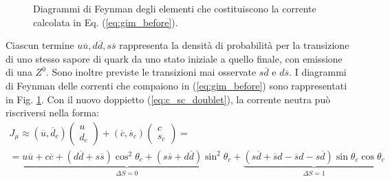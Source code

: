 \documentclass{subnucbo}
\begin{document}
\begin{figure}[!h]
        \centering
        \caption{Diagrammi di Feynman degli elementi che costituiscono la corrente calcolata in Eq. (\ref{eq:gim_before}).}
        \label{fig:gim_before}
\end{figure}
Ciascun termine $u \overline { u } , d \overline { d } , s \overline { s }$ rappresenta la densità di probabilità per la transizione di uno stesso sapore di quark da uno stato iniziale a quello finale, con emissione di una $Z^{0}$. Sono inoltre previste le transizioni mai osservate $s\overline{d}$ e $d\overline{s}$. I diagrammi di Feynman delle correnti che compaiono in (\ref{eq:gim_before}) sono rappresentati in Fig. \ref{fig:gim_before}.
Con il nuovo doppietto (\ref{eq:c_sc_doublet}), la corrente neutra può riscriversi nella forma:
\begin{equation}
        \begin{array} { l } J _ { \mu } \approx { \left( \overline { u } , \overline { d } _ { c } \right) \left( \begin{array} { c } { u } \\ { d _ { c } } \end{array} \right) + \left( \overline { c } , \overline { s } _ { c } \right) \left( \begin{array} { c } { c } \\ { s _ { c } } \end{array} \right) = } \\ { = \underbrace { u \overline { u } + c \overline { c } + ( d \overline { d } + s \overline { s } ) \cos ^ { 2 } \theta _ { c } + ( s \overline { s } + d \overline { d } ) \sin ^ { 2 } \theta _ { c } } _ { \Delta S = 0 } + \underbrace { ( s \overline { d } + \overline { s } d - \overline { s } d - s \overline { d } ) \sin \theta _ { c } \cos \theta _ { c } } _ { \Delta S = 1 } } \end{array}
        \label{eq:gim_after}
\end{equation}
\end{document}
